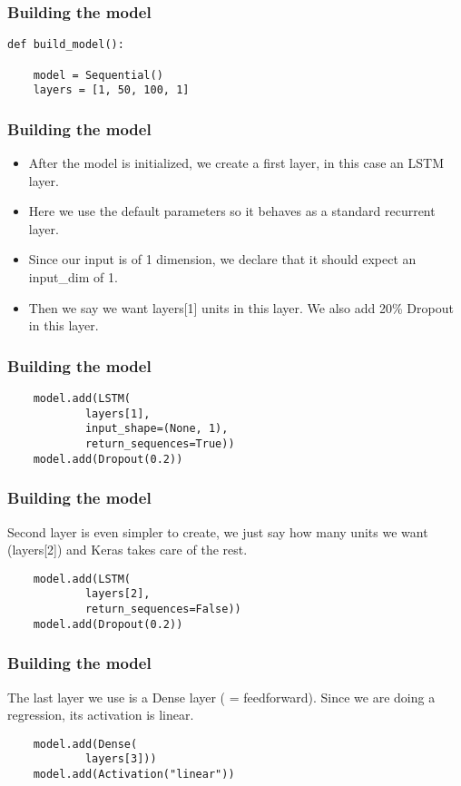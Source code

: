 \begin{frame}[fragile] \frametitle{Building the model}
\begin{lstlisting}
def build_model():

    model = Sequential()
    layers = [1, 50, 100, 1]
\end{lstlisting}
\end{frame}


\begin{frame}[fragile] \frametitle{Building the model}
\begin{itemize}
\item After the model is initialized, we create a first layer, in this case an LSTM layer. 
\item Here we use the default parameters so it behaves as a standard recurrent layer. 
\item Since our input is of 1 dimension, we declare that it should expect an input\_dim of 1. 
\item Then we say we want layers[1] units in this layer. We also add 20\% Dropout in this layer.
\end{itemize}
\end{frame}

\begin{frame}[fragile] \frametitle{Building the model}
\begin{lstlisting}
    model.add(LSTM(
            layers[1],
            input_shape=(None, 1),
            return_sequences=True))
    model.add(Dropout(0.2))
\end{lstlisting}    
\end{frame}

\begin{frame}[fragile] \frametitle{Building the model}
Second layer is even simpler to create, we just say how many units we want (layers[2]) and Keras takes care of the rest.
\begin{lstlisting}
    model.add(LSTM(
            layers[2],
            return_sequences=False))
    model.add(Dropout(0.2))
\end{lstlisting}    
\end{frame}

\begin{frame}[fragile] \frametitle{Building the model}
The last layer we use is a Dense layer ( = feedforward). Since we are doing a regression, its activation is linear.
\begin{lstlisting}
    model.add(Dense(
            layers[3]))
    model.add(Activation("linear"))
\end{lstlisting}    
\end{frame}

